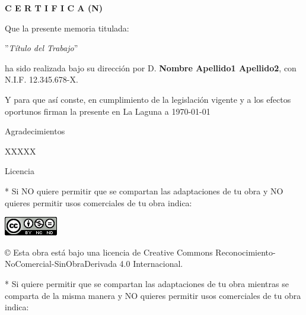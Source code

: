 \documentclass[a4paper,12pt,oneside]{report}
\begin{document}
\bigskip
\bigskip
{\bf C E R T I F I C A (N)}

\bigskip
\bigskip
Que la presente memoria titulada:

\bigskip
''{\it Título del Trabajo}''

\bigskip
\bigskip
\bigskip

\noindent ha sido realizada bajo su dirección por D. {\bf Nombre Apellido1 Apellido2},
con N.I.F. 12.345.678-X.

\bigskip
\bigskip

Y para que así conste, en cumplimiento de la legislación vigente y a los efectos
oportunos firman la presente en La Laguna a \today

\newpage
\thispagestyle{empty}

{ \flushright

\begin{LARGE}
Agradecimientos
\end{LARGE}

\hspace{3mm}

\begin{large}
XXXXX
\end{large}

}
\newpage
\thispagestyle{empty}

\bigskip
\begin{LARGE}
Licencia
\end{LARGE}

\bigskip
* Si NO quiere permitir que se compartan las adaptaciones de tu obra y NO quieres permitir usos comerciales de tu obra indica:

\begin{center}
\includegraphics[scale=1.8]{images/by-nc-nd_88x31}\\[5mm]
\end{center}

\begin{large}
© Esta obra está bajo una licencia de Creative Commons Reconocimiento-NoComercial-SinObraDerivada 4.0 Internacional.
\end{large}

\bigskip
\bigskip
\bigskip
* Si quiere permitir que se compartan las adaptaciones de tu obra mientras se comparta de la misma manera y NO quieres permitir usos comerciales de tu obra indica:
\end{document}
